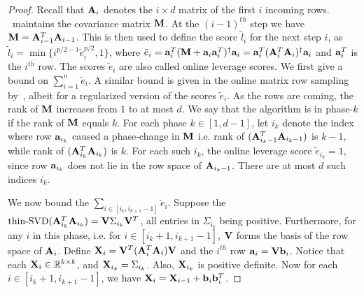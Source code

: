 \begin{proof}{\label{proof:onlineSummationBound}}
Recall that $\mathbf{A}_i$ denotes the $i\times d$ matrix of the first $i$ incoming rows. \online~maintains the covariance matrix $\mathbf{M}$. At the $(i-1)^{th}$ step we have $\mathbf{M} = \mathbf{A}_{i-1}^T\mathbf{A}_{i-1}$. This is then used to define the score $\tilde{l}_{i}$  for the next step $i$, as $\tilde{l}_i = \min\{i^{p/2-1}\tilde{e}_{i}^{p/2},1\}$, where $\tilde{e}_i = \mathbf{a}_{i}^T (\mathbf{M} + \mathbf{a}_{i} \mathbf{a}_{i}^{T})^{\dagger} \mathbf{a}_{i} = \mathbf{a}_{i}^T (\mathbf{A}_{i}^T \mathbf{A}_{i})^{\dagger} \mathbf{a}_{i}$ and $\mathbf{a}_{i}^{T}$ is the $i^{th}$ row. 
The scores $\tilde{e}_{i}$ are also called online leverage scores. We first give a bound on $\sum_{i=1}^{n} \tilde{e}_{i}$. A similar bound is given in the online matrix row sampling by~\cite{cohen2016online}, albeit for a regularized version of the scores $\tilde{e}_i$. 
As the rows are coming, the rank of $\mathbf{M}$ increases 
from $1$ to at most $d$. We say that the algorithm is
in phase-$k$ if the rank of $\mathbf{M}$ equals $k$. For each phase $k \in [1, d-1]$, let $i_k$ denote the index
where row $\mathbf{a}_{i_k}$ caused a phase-change in $\mathbf{M}$ i.e. 
rank of $(\mathbf{A}_{i_k-1}^{T} \mathbf{A}_{i_k-1})$ is $k-1$, while rank of $(\mathbf{A}_{i_k}^{T} \mathbf{A}_{i_k})$ is $k$. 
For each such $i_k$, the online leverage score $\tilde{e}_{i_k} = 1$, since row $\mathbf{a}_{i_k}$
does not lie in the row space of $\mathbf{A}_{i_k-1}$. There
are at most $d$ such indices $i_k$.

We now bound the $\sum_{i\in [i_k, i_{k+1}-1]} \tilde{e}_i$. Suppose the $\mbox{thin-SVD}(\mathbf{A}_{i_k}^T \mathbf{A}_{i_k})=\mathbf{V}\Sigma_{i_k} \mathbf{V}^T$, all entries in $\Sigma_{i_k}$ being positive. 
Furthermore, for any $i$ in this phase, i.e. for $i\in [i_{k}+1, i_{k+1}-1]$, $\mathbf{V}$ forms the basis of the row space of $\mathbf{A}_{i}$. Define
$\mathbf{X}_{i} = \mathbf{V}^T (\mathbf{A}_{i}^T \mathbf{A}_{i}) \mathbf{V}$ and the $i^{th}$ row $\mathbf{a}_{i} = \mathbf{V} \mathbf{b}_{i}$. Notice that each $\mathbf{X}_{i}\in \mathbb{R}^{k\times k}$, and $\mathbf{X}_{i_k} = \Sigma_{i_k}$. Also, $\mathbf{X}_{i_k}$ is positive definite. Now for each $i\in [i_{k}+1, i_{k+1}-1]$, we have $\mathbf{X}_{i} = \mathbf{X}_{i-1} + \mathbf{b}_{i} \mathbf{b}_{i}^T$.


\end{proof}
